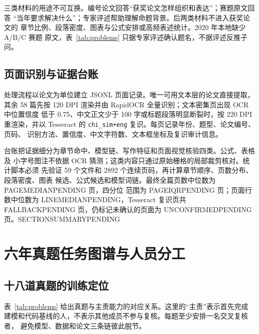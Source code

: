 \documentclass[UTF8,a4paper,12pt]{ctexart}
\newcommand{\CorpusPageMedian}{PAGEMEDIANPENDING}
\newcommand{\CorpusPageIQR}{PAGEIQRPENDING}
\newcommand{\CorpusLineMedian}{LINEMEDIANPENDING}
\newcommand{\CorpusFallbackPages}{FALLBACKPENDING}
\newcommand{\CorpusUnconfirmedPages}{UNCONFIRMEDPENDING}
\newcommand{\CorpusSectionSummary}{SECTIONSUMMARYPENDING}
\begin{document}
三类材料的用途不可互换。编号论文回答“获奖论文怎样组织和表达”；赛题原文回答
“当年要求解决什么”；专家评述帮助理解命题背景。后两类材料不进入获奖论文的
章节比例、段落密度、图表与公式安排或高频表述统计。2020 年本地缺少 A/B/C 赛题
原文，表~\ref{tab:problems} 只据专家评述确认题名，不据评述反推子问。

\subsection{页面识别与证据台账}

处理流程以论文为单位建立 JSONL 页面记录。唯一可用文本层的论文直接提取，其余
58 篇先按 120 DPI 渲染并由 RapidOCR 全量识别；文本密集页出现 OCR 中位置信度
低于 0.75、中文正文少于 100 字或标题段落明显断裂时，按 220 DPI 重渲染，并以
Tesseract 的 \texttt{chi\_sim+eng} 复识。每页记录年份、题型、论文编号、页码、
识别方法、置信度、中文字符数、文本框坐标及复识审计信息。

台账把证据细分为章节命中、模型链、写作特征和页面视觉核验四类。公式、表格及
小字号图注不依据 OCR 猜测；这类内容只通过原始栅格的局部裁剪核对。统计脚本必须
先验证 59 个文件和 2892 个连续页码，再计算章节顺序、页数分布、段落密度、图表
候选、公式候选和模型词链。最终全篇页数中位数为 \CorpusPageMedian{} 页，四分位
范围为 \CorpusPageIQR{} 页；页面行数中位数为 \CorpusLineMedian{}，Tesseract
复识页共 \CorpusFallbackPages{} 页，仍标记未确认的页面为
\CorpusUnconfirmedPages{} 页。\CorpusSectionSummary

\section{六年真题任务图谱与人员分工}

\subsection{十八道真题的训练定位}

表~\ref{tab:problems} 给出真题与主责能力的对应关系。这里的“主责”表示首先完成
建模和代码基线的人，不表示其他成员不参与复核。每题至少安排一名交叉复核者，
避免模型、数据和论文三条链彼此脱节。
\end{document}
